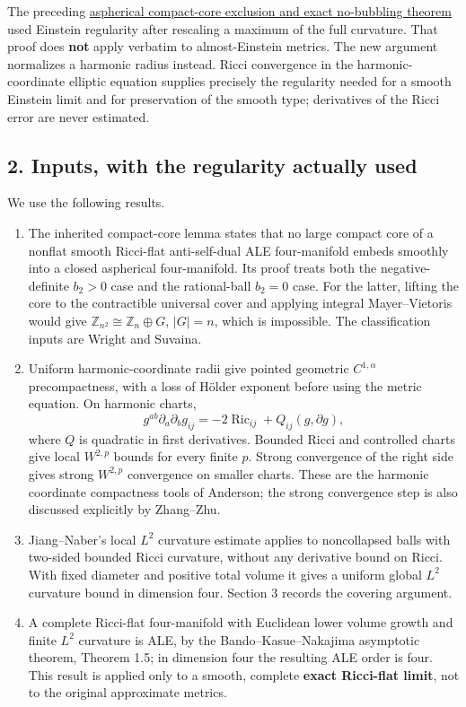 \documentclass[
  11pt,
]{article}
\providecommand{\tightlist}{%
  \setlength{\itemsep}{0pt}\setlength{\parskip}{0pt}}
\begin{document}
The preceding
\href{../mathematics/current/line1_aspherical_no_bubbles.md}{aspherical
compact-core exclusion and exact no-bubbling theorem} used Einstein
regularity after rescaling a maximum of the full curvature. That proof
does \textbf{not} apply verbatim to almost-Einstein metrics. The new
argument normalizes a harmonic radius instead. Ricci convergence in the
harmonic-coordinate elliptic equation supplies precisely the regularity
needed for a smooth Einstein limit and for preservation of the smooth
type; derivatives of the Ricci error are never estimated.

\hypertarget{inputs-with-the-regularity-actually-used}{%
\subsection{2. Inputs, with the regularity actually
used}\label{inputs-with-the-regularity-actually-used}}

We use the following results.

\begin{enumerate}
\def\labelenumi{\arabic{enumi}.}
\tightlist
\item
  The inherited compact-core lemma states that no large compact core of
  a nonflat smooth Ricci-flat anti-self-dual ALE four-manifold embeds
  smoothly into a closed aspherical four-manifold. Its proof treats both
  the negative-definite \(b_2>0\) case and the rational-ball \(b_2=0\)
  case. For the latter, lifting the core to the contractible universal
  cover and applying integral Mayer--Vietoris would give
  \(\mathbb Z_{n^2}\cong\mathbb Z_n\oplus G\), \(|G|=n\), which is
  impossible. The classification inputs are Wright and Suvaina.
\item
  Uniform harmonic-coordinate radii give pointed geometric
  \(C^{1,\alpha}\) precompactness, with a loss of Hölder exponent before
  using the metric equation. On harmonic charts, \[
    g^{ab}\partial_a\partial_b g_{ij}
       =-2\operatorname{Ric}_{ij}+Q_{ij}(g,\partial g), \tag{3}
  \] where \(Q\) is quadratic in first derivatives. Bounded Ricci and
  controlled charts give local \(W^{2,p}\) bounds for every finite
  \(p\). Strong convergence of the right side gives strong \(W^{2,p}\)
  convergence on smaller charts. These are the harmonic coordinate
  compactness tools of Anderson; the strong convergence step is also
  discussed explicitly by Zhang--Zhu.
\item
  Jiang--Naber's local \(L^2\) curvature estimate applies to
  noncollapsed balls with two-sided bounded Ricci curvature, without any
  derivative bound on Ricci. With fixed diameter and positive total
  volume it gives a uniform global \(L^2\) curvature bound in dimension
  four. Section 3 records the covering argument.
\item
  A complete Ricci-flat four-manifold with Euclidean lower volume growth
  and finite \(L^2\) curvature is ALE, by the Bando--Kasue--Nakajima
  asymptotic theorem, Theorem 1.5; in dimension four the resulting ALE
  order is four. This result is applied only to a smooth, complete
  \textbf{exact Ricci-flat limit}, not to the original approximate
  metrics.
\end{enumerate}
\end{document}
